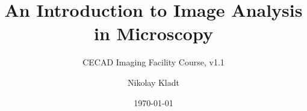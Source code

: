 \documentclass[12pt,twoside, parskip=half, headsepline=on, chapterprefix=true, draft=off]{scrbook}
\begin{document}
\title{An Introduction to Image Analysis in Microscopy}
\subtitle{CECAD Imaging Facility Course, v1.1} 
\author{Nikolay Kladt}
\date{\today}
\publishers{Imaging Facility\\Cluster of Excellence -- Cellular Stress Responses in Aging-Associated Diseases\\University of Cologne}

\maketitle

\tableofcontents

%




%
\end{document}
